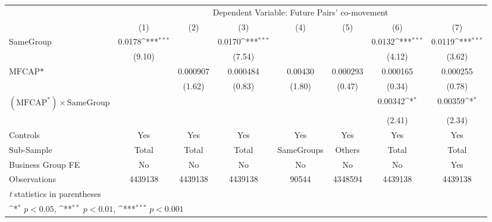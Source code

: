 {
\def\sym#1{\ifmmode^{#1}\else\(^{#1}\)\fi}
\begin{tabular}{l*{7}{c}}
\hline\hline
                &\multicolumn{7}{c}{Dependent Variable: Future Pairs' co-movement}                                                                   \\\cmidrule(lr){2-8}
                &\multicolumn{1}{c}{(1)}         &\multicolumn{1}{c}{(2)}         &\multicolumn{1}{c}{(3)}         &\multicolumn{1}{c}{(4)}         &\multicolumn{1}{c}{(5)}         &\multicolumn{1}{c}{(6)}         &\multicolumn{1}{c}{(7)}         \\
\hline
SameGroup       &   0.0178\sym{***}&                  &   0.0170\sym{***}&                  &                  &   0.0132\sym{***}&   0.0119\sym{***}\\
                &   (9.10)         &                  &   (7.54)         &                  &                  &   (4.12)         &   (3.62)         \\
[1em]
$ \text{MFCAP*} $&                  & 0.000907         & 0.000484         &  0.00430         & 0.000293         & 0.000165         & 0.000255         \\
                &                  &   (1.62)         &   (0.83)         &   (1.80)         &   (0.47)         &   (0.34)         &   (0.78)         \\
[1em]
 $ (\text{MFCAP}^*) \times {\text{SameGroup} }  $ &                  &                  &                  &                  &                  &  0.00342\sym{*}  &  0.00359\sym{*}  \\
                &                  &                  &                  &                  &                  &   (2.41)         &   (2.34)         \\
\hline
Controls        &      Yes         &      Yes         &      Yes         &      Yes         &      Yes         &      Yes         &      Yes         \\
Sub-Sample      &    Total         &    Total         &    Total         &SameGroups         &   Others         &    Total         &    Total         \\
Business Group FE&       No         &       No         &       No         &       No         &       No         &       No         &      Yes         \\
Observations    &  4439138         &  4439138         &  4439138         &    90544         &  4348594         &  4439138         &  4439138         \\
\hline\hline
\multicolumn{8}{l}{\footnotesize \textit{t} statistics in parentheses}\\
\multicolumn{8}{l}{\footnotesize \sym{*} \(p<0.05\), \sym{**} \(p<0.01\), \sym{***} \(p<0.001\)}\\
\end{tabular}
}
